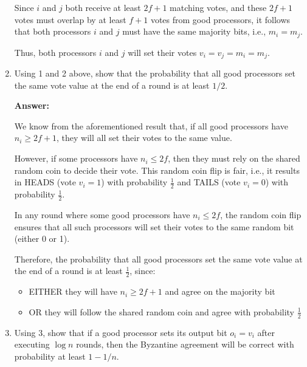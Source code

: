 \documentclass[11pt]{article}
\begin{document}
\begin{enumerate}
    Since \(i\) and \(j\) both receive at least \(2f + 1\) matching votes, and these \(2f + 1\) votes must overlap by at least \(f + 1\) votes from good processors, it follows that both processors \(i\) and \(j\) must have the same majority bits, i.e., \(m_i = m_j\).

    Thus, both processors \(i\) and \(j\) will set their votes \(v_i = v_j = m_i = m_j\). %
    
    \item Using 1 and 2 above, show that the probability that all good processors set the same vote value at the end of a round is at least $1/2$.

    \textbf{Answer:}

    We know from the aforementioned result that, if all good processors have \(n_i \geq 2f + 1\), they will all set their votes to the same value.

    However, if some processors have \(n_i \leq 2f\), then they must rely on the shared random coin to decide their vote. This random coin flip is fair, i.e., it results in HEADS (vote \(v_i = 1\)) with probability \(\frac{1}{2}\) and TAILS (vote \(v_i = 0\)) with probability \(\frac{1}{2}\).

    In any round where some good processors have \(n_i \leq 2f\), the random coin flip ensures that all such processors will set their votes to the same random bit (either 0 or 1).

    Therefore, the probability that all good processors set the same vote value at the end of a round is at least \(\frac{1}{2}\), since:
    
    \begin{itemize}
        \item EITHER they will have \(n_i \geq 2f + 1\) and agree on the majority bit

        \item OR they will follow the shared random coin and agree with probability \(\frac{1}{2}\)
    \end{itemize}
    
    
    \item Using 3, show that if a good processor sets its output bit $o_i = v_i$ after executing $\log n$ rounds, then the Byzantine agreement will be correct with probability at least $1-1/n$.


\end{enumerate}
\end{document}
